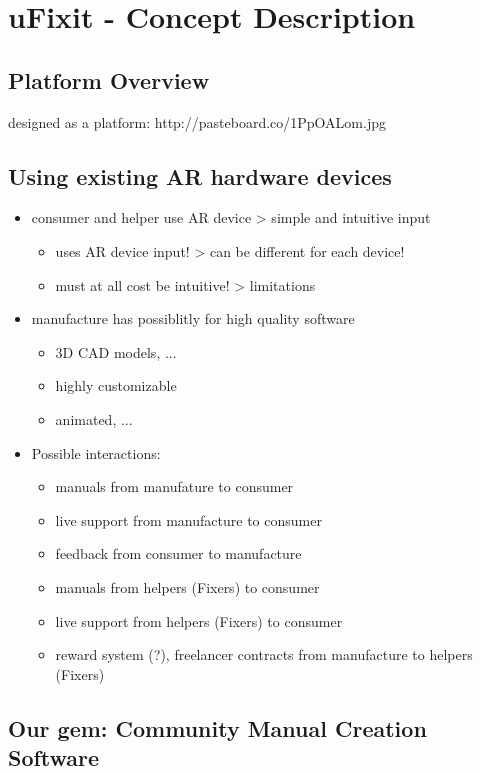 
\chapter{uFixit - Concept Description}

	\section{Platform Overview}
	
		designed as a platform: http://pasteboard.co/1PpOALom.jpg
	
	\section{Using existing AR hardware devices}
	
		\begin{itemize}
			\itemsep0em
			\item consumer and helper use AR device > simple and intuitive input \begin{itemize}
				\itemsep0em
				\item uses AR device input! > can be different for each device!
				\item must at all cost be intuitive! > limitations
			\end{itemize}
			\item manufacture has possiblitly for high quality software \begin{itemize}
				\itemsep0em
				\item 3D CAD models, ...
				\item highly customizable
				\item animated, ...
			\end{itemize}
			\item Possible interactions: \begin{itemize}
				\itemsep0em
				\item manuals from manufature to consumer
				\item live support from manufacture to consumer
				\item feedback from consumer to manufacture
				\item manuals from helpers (Fixers) to consumer
				\item live support from helpers (Fixers) to consumer
				\item reward system (?), freelancer contracts from manufacture to helpers (Fixers)
			\end{itemize}
		\end{itemize}
		
	\section{Our gem: Community Manual Creation Software}